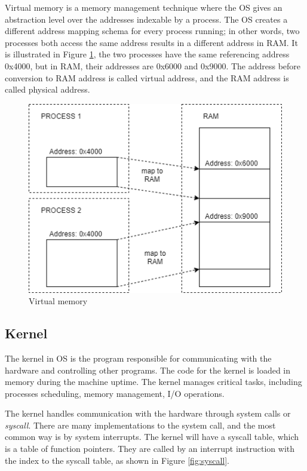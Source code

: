 Virtual memory is a memory management technique where the OS gives an
abstraction level over the addresses indexable by a process. The OS creates a
different address mapping schema for every process running; in other words, two
processes both access the same address results in a different address in RAM.
It is illustrated in Figure \ref{fig:virtualmem}, the two processes have the
same referencing address 0x4000, but in RAM, their addresses are 0x6000 and
0x9000. The address before conversion to RAM address is called virtual address,
and the RAM address is called physical address.

\begin{figure}[h]
  \centering
  \caption{Virtual memory}
  \label{fig:virtualmem}
  \includegraphics[scale=0.8]{images/virtualmem.png}
\end{figure}

\subsection[Kernel]{Kernel}

The kernel in OS is the program responsible for communicating with the hardware
and controlling other programs. The code for the kernel is loaded in memory
during the machine uptime. The kernel manages critical tasks, including
processes scheduling, memory management, I/O operations.

The kernel handles communication with the hardware through system calls or
\textit{syscall}. There are many implementations to the system call, and the
most common way is by system interrupts.  The kernel will have a syscall table,
which is a table of function pointers. They are called by an interrupt
instruction with the index to the syscall table, as shown in Figure
\ref{fig:syscall}.

